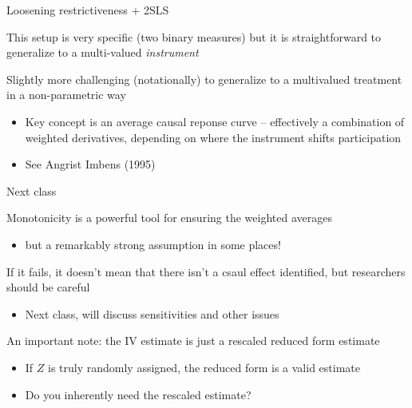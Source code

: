 \documentclass[notes,11pt, aspectratio=169]{beamer}
\newenvironment{wideitemize}{\itemize\addtolength{\itemsep}{10pt}}{\enditemize}
\begin{document}
\begin{frame}{Loosening restrictiveness + 2SLS}
  \begin{wideitemize}
  \item This setup is very specific (two binary measures) but it is
    straightforward to generalize to a multi-valued \emph{instrument}
  \item Slightly more challenging (notationally) to generalize to a multivalued
    treatment in a non-parametric way
    \begin{itemize}
    \item Key concept is an average causal reponse curve --
      effectively a combination of weighted derivatives, depending on
      where the instrument shifts participation
    \item See Angrist Imbens (1995)
    \end{itemize}
  \end{wideitemize}
\end{frame}

\begin{frame}{Next class}
  \begin{wideitemize}
  \item   Monotonicity is a powerful tool for ensuring the weighted averages
    \begin{itemize}
    \item   but a remarkably strong assumption in some places!
    \end{itemize}
  \item If it fails, it doesn't mean that there isn't a csaul effect
    identified, but researchers should be careful
    \begin{itemize}
    \item Next class, will discuss sensitivities and other issues
    \end{itemize}
  \item An important note: the IV estimate is just a rescaled reduced
    form estimate
    \begin{itemize}
    \item If $Z$ is truly randomly assigned, the reduced form is a valid estimate
      \item Do you inherently need the rescaled estimate? 
    \end{itemize}
  \end{wideitemize}
\end{frame}
\end{document}
